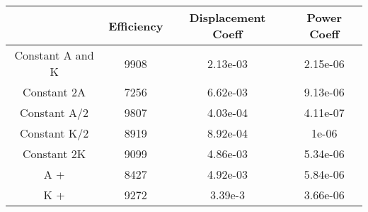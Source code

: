 \begin{figure}[H]
\centering
  \begin{footnotesize}
  
  \caption[]{}
   \label{fig:Bild4.xxx}
  \end{footnotesize}
\end{figure}



\begin{table}[h]
\begin{tabular}{|c|c|c|c|}
\hline
                 & Efficiency & Displacement Coeff & Power Coeff \\ \hline
Constant A and K & 9908       & 2.13e-03           & 2.15e-06    \\ \hline
Constant 2A      & 7256       & 6.62e-03           & 9.13e-06    \\ \hline
Constant A/2     & 9807       & 4.03e-04           & 4.11e-07    \\ \hline
Constant K/2     & 8919       & 8.92e-04           & 1e-06       \\ \hline
Constant 2K      & 9099       & 4.86e-03           & 5.34e-06    \\ \hline
A +              & 8427       & 4.92e-03           & 5.84e-06    \\ \hline
K +              & 9272       & 3.39e-3            & 3.66e-06    \\ \hline
\end{tabular}
\end{table}